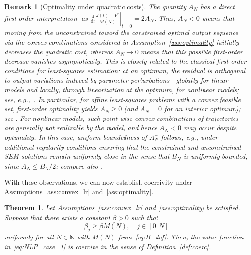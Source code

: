 \documentclass[a4paper,fleqn]{cas-dc}
\newtheorem{thm}{Theorem}
\newtheorem{rem}{Remark}
\begin{document}
\begin{rem}[Optimality under quadratic costs]
	The quantity $A_N$ has a direct first-order interpretation, as $\left.\frac{\mathrm d}{\mathrm dt}\frac{J(t)-V^*}{M(N)}\right|_{t=0}=2A_N$.
	Thus, $A_N<0$ means that moving from the unconstrained toward the constrained optimal output sequence via the convex combinations considered in Assumption~\ref{ass:optimality} initially decreases the quadratic cost, whereas $A_N^-\to0$ means that this possible first-order decrease vanishes asymptotically.
	This is closely related to the classical first-order conditions for least-squares estimation: at an optimum, the residual is orthogonal to output variations induced by parameter perturbations---globally for linear models and locally, through linearization at the optimum, for nonlinear models; see, e.g.,~\cite{Bates1988,Ljung1999}.
	In particular, for affine least-squares problems with a convex feasible set, first-order optimality yields $A_N\geq0$ (and $A_N=0$ for an interior optimum); see \cite[Sec.~4.2.3]{Boyd2004}. For nonlinear models, such point-wise convex combinations of trajectories are generally not realizable by the model, and hence $A_N<0$ may occur despite optimality. In this case, uniform boundedness of \(A_N^-\) follows, e.g., under additional regularity conditions ensuring that the constrained and unconstrained SEM solutions remain uniformly close in the sense that \(B_N\) is uniformly bounded, since \(A_N^-\le B_N/2\); compare also \cite[Sec.~IV]{Ljung1978}.
\end{rem}

With these observations, we can now establish coercivity under Assumptions~\ref{ass:convex_lr} and~\ref{ass:optimality}.

\begin{thm}\label{thm:coerc}	
	Let Assumptions~\ref{ass:convex_lr} and~\ref{ass:optimality} be satisfied.
	Suppose that there exists a constant $\underline{\beta}>0$ such that%
	\begin{equation}\label{eq:beta_lower_bound}
		\beta_j \geq \underline{\beta}M(N), \quad j\in[0,N]
	\end{equation}
	uniformly for all $N\in\mathbb{N}$ with $M(N)$ from~\eqref{eq:B_def}.
	Then, the value function in~\eqref{eq:NLP_case_1} is coercive in the sense of Definition~\ref{def:coerc}.
\end{thm}
\end{document}
